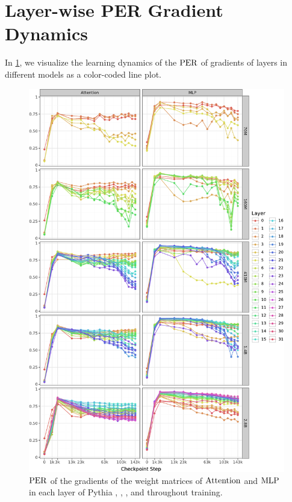 \section{Layer-wise PER Gradient Dynamics}
\label{app:layerwise-per_grad-figures}

In \cref{fig:per_grad-layer-wise-lines}, we visualize the learning dynamics of the $\mathrm{PER}$ of gradients of layers in different models as a color-coded line plot. 
\vspace{0.2cm}

\begin{figure}[h!]
    \centering
    \includegraphics[width=0.90\linewidth]{chapters/tending-towards-stability/figures/per_grad_lines.pdf}
    \vspace{-5pt}
    \caption{$\mathrm{PER}$ of the gradients of the weight matrices of $\mathrm{Attention}$ and $\mathrm{MLP}$ in each layer of Pythia , , ,  and  throughout training.}%
    \label{fig:per_grad-layer-wise-lines}
\end{figure}


